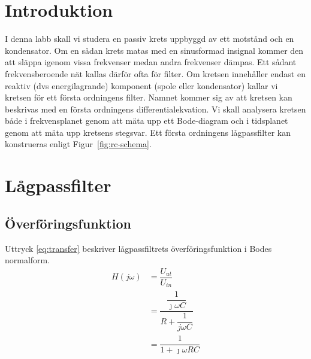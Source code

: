 %
%

\section{Introduktion}\label{intro}
I denna labb skall vi studera en passiv krets uppbyggd av ett motstånd och en
kondensator. Om en sådan krets matas med en sinusformad insignal kommer den att
släppa igenom vissa frekvenser medan andra frekvenser dämpas. Ett sådant
frekvensberoende nät kallas därför ofta för filter. Om kretsen innehåller
endast en reaktiv (dvs energilagrande) komponent (spole eller kondensator)
kallar vi kretsen för ett första ordningens filter. Namnet kommer sig av att
kretsen kan beskrivas med en första ordningens differentialekvation.  Vi skall
analysera kretsen både i frekvensplanet genom att mäta upp ett Bode-diagram och
i tidsplanet genom att mäta upp kretsens stegsvar.  Ett första ordningens
lågpassfilter kan konstrueras enligt Figur~\ref{fig:rc-schema}.

\section{Lågpassfilter}
\subsection{Överföringsfunktion}
Uttryck \eqref{eq:transfer} beskriver lågpassfiltrets överföringsfunktion i
Bodes normalform.
\begin{equation*}
    \begin{split}
        H(j\omega) &= \dfrac{U_{ut}}{U_{in}}                                      \\
                   &= \dfrac{\dfrac{1}{\jmath\omega C}}{R + \dfrac{1}{j\omega C}} \\
                   &= \dfrac{1}{1+\jmath\omega R C}                               \\
    \end{split}
\end{equation*}

